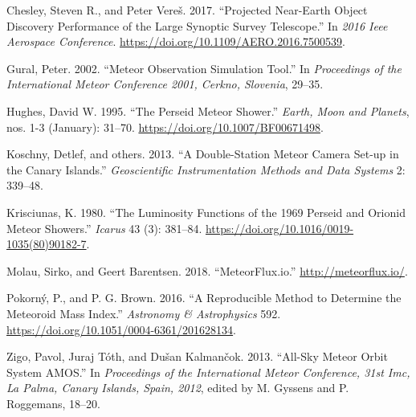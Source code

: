 \hypertarget{ref-chesley2017}{}
Chesley, Steven R., and Peter Vereš. 2017. ``Projected Near-Earth Object
Discovery Performance of the Large Synoptic Survey Telescope.'' In
\emph{2016 Ieee Aerospace Conference}.
\url{https://doi.org/10.1109/AERO.2016.7500539}.

\hypertarget{ref-gural2002}{}
Gural, Peter. 2002. ``Meteor Observation Simulation Tool.'' In
\emph{Proceedings of the International Meteor Conference 2001, Cerkno,
Slovenia}, 29--35.

\hypertarget{ref-hughes1995}{}
Hughes, David W. 1995. ``The Perseid Meteor Shower.'' \emph{Earth, Moon
and Planets}, nos. 1-3 (January): 31--70.
\url{https://doi.org/10.1007/BF00671498}.

\hypertarget{ref-koschny2013}{}
Koschny, Detlef, and others. 2013. ``A Double-Station Meteor Camera
Set-up in the Canary Islands.'' \emph{Geoscientific Instrumentation
Methods and Data Systems} 2: 339--48.

\hypertarget{ref-krisciunas1980}{}
Krisciunas, K. 1980. ``The Luminosity Functions of the 1969 Perseid and
Orionid Meteor Showers.'' \emph{Icarus} 43 (3): 381--84.
\url{https://doi.org/10.1016/0019-1035(80)90182-7}.

\hypertarget{ref-meteorflux}{}
Molau, Sirko, and Geert Barentsen. 2018. ``MeteorFlux.io.''
\url{http://meteorflux.io/}.

\hypertarget{ref-pokorny-brown2016}{}
Pokorný, P., and P. G. Brown. 2016. ``A Reproducible Method to Determine
the Meteoroid Mass Index.'' \emph{Astronomy \& Astrophysics} 592.
\url{https://doi.org/10.1051/0004-6361/201628134}.

\hypertarget{ref-zigo2013}{}
Zigo, Pavol, Juraj Tóth, and Dušan Kalmančok. 2013. ``All-Sky Meteor
Orbit System AMOS.'' In \emph{Proceedings of the International Meteor
Conference, 31st Imc, La Palma, Canary Islands, Spain, 2012}, edited by
M. Gyssens and P. Roggemans, 18--20.
